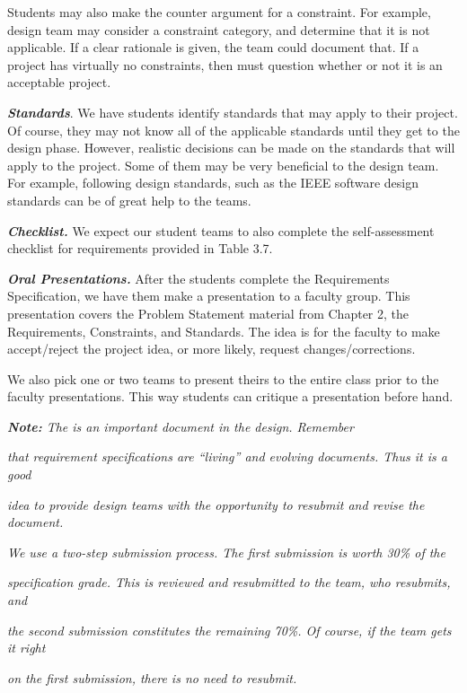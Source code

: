 \begin{enumerate}
\begin{onlysolution}
Students may also make the counter argument for a constraint. For
example, design team may consider a constraint category, and determine
that it is not applicable. If a clear rationale is given, the team could
document that. If a project has virtually no constraints, then must
question whether or not it is an acceptable project.

\emph{\textbf{Standards}}. We have students identify standards that
may apply to their project. Of course, they may not know all of
the applicable standards until they get to the design phase.
However, realistic decisions can be made on the standards that will
apply to the project. Some of them may be very beneficial to the design
team. For example, following design standards, such as the IEEE software
design standards can be of great help to the teams.

\emph{\textbf{Checklist.}} We expect our student teams to also complete
the self-assessment checklist for requirements provided in Table 3.7.

\emph{\textbf{Oral Presentations.}} After the students complete the
Requirements Specification, we have them make a presentation to a
faculty group. This presentation covers the Problem Statement material
from Chapter 2, the Requirements, Constraints, and Standards. The idea
is for the faculty to make accept/reject the project idea, or more
likely, request changes/corrections.

We also pick one or two teams to present theirs to the entire class
prior to the faculty presentations. This way students can
critique a presentation before hand.

\emph{\textbf{Note:} The  is an
important document in the design. Remember}

\emph{that requirement specifications are ``living'' and evolving
documents. Thus it is a good}

\emph{idea to provide design teams with the opportunity to resubmit and
revise the document.}

\emph{We use a two-step submission process. The first submission is
worth 30\% of the}

\emph{specification grade. This is reviewed and resubmitted to the team,
who resubmits, and}

\emph{the second submission constitutes the remaining 70\%. Of course,
if the team gets it right}

\emph{on the first submission, there is no need to resubmit.}


\end{onlysolution}
\end{enumerate}
